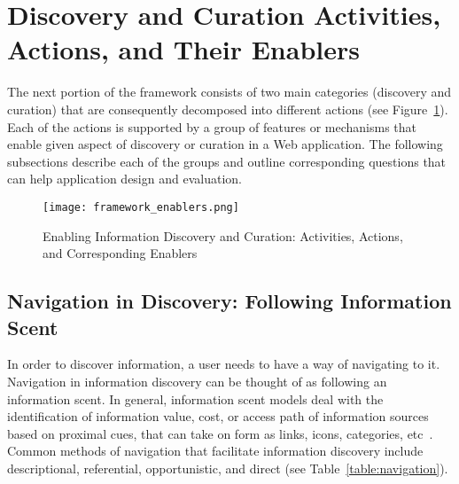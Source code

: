 {\section{Discovery and Curation Activities, Actions, and Their Enablers}
The next portion of the framework consists of two main categories (discovery and curation) that are consequently decomposed into different actions (see Figure~\ref{fig:enablers}). Each of the actions is supported by a group of features or mechanisms that enable given aspect of discovery or curation in a Web application.  The following subsections describe each of the groups and outline corresponding questions that can help application design and evaluation.  

\begin{figure}[ht!]
	\noindent
	\centering
	\texttt{[image: framework\_enablers.png]}
	\caption{Enabling Information Discovery and Curation: Activities, Actions, and Corresponding Enablers}
	\label{fig:enablers} 
\end{figure}

{\subsection{Navigation in Discovery: Following Information Scent}
In order to discover information, a user needs to have a way of navigating to it. Navigation in information discovery can be thought of as following an information scent. In general, information scent models deal with the identification of information value, cost, or
access path of information sources based on proximal cues, that can take on form as links, icons, categories, etc~\cite{pirolli1999information}. Common methods of navigation that facilitate information discovery include descriptional, referential, opportunistic, and direct (see Table~\ref{table:navigation}). 


}}
